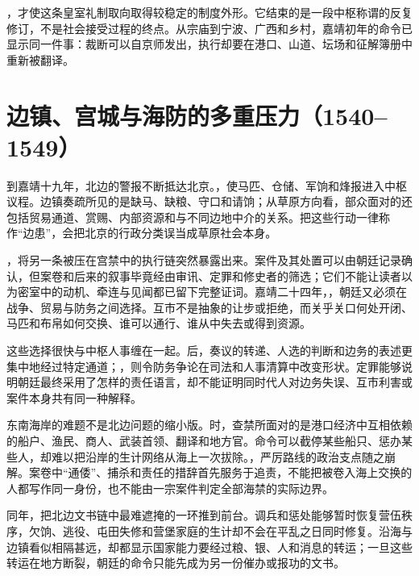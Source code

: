 ，才使这条皇室礼制取向取得较稳定的制度外形。它结束的是一段中枢称谓的反复修订，不是社会接受过程的终点。从宗庙到宁波、广西和乡村，嘉靖初年的命令已显示同一件事：裁断可以自京师发出，执行却要在港口、山道、坛场和征解簿册中重新被翻译。

\section{边镇、宫城与海防的多重压力（1540--1549）}

到嘉靖十九年，北边的警报不断抵达北京。，使马匹、仓储、军饷和烽报进入中枢议程。边镇奏疏所见的是缺马、缺粮、守口和请饷；从草原方向看，部众面对的还包括贸易通道、赏赐、内部资源和与不同边地中介的关系。把这些行动一律称作“边患”，会把北京的行政分类误当成草原社会本身。

，将另一条被压在宫禁中的执行链突然暴露出来。案件及其处置可以由朝廷记录确认，但案卷和后来的叙事毕竟经由审讯、定罪和修史者的筛选；它们不能让读者以为密室中的动机、牵连与见闻都已留下完整证词。嘉靖二十四年，，朝廷又必须在战争、贸易与防务之间选择。互市不是抽象的让步或拒绝，而关乎关口何处开闭、马匹和布帛如何交换、谁可以通行、谁从中失去或得到资源。

这些选择很快与中枢人事缠在一起。后，奏议的转递、人选的判断和边务的表述更集中地经过特定通道；，则令防务争论在司法和人事清算中改变形状。定罪能够说明朝廷最终采用了怎样的责任语言，却不能证明同时代人对边务失误、互市利害或案件本身共有同一种解释。

东南海岸的难题不是北边问题的缩小版。时，查禁所面对的是港口经济中互相依赖的船户、渔民、商人、武装首领、翻译和地方官。命令可以截停某些船只、惩办某些人，却难以把沿岸的生计网络从海上一次拔除。，严厉路线的政治支点随之崩解。案卷中“通倭”、捕杀和责任的措辞首先服务于追责，不能把被卷入海上交换的人都写作同一身份，也不能由一宗案件判定全部海禁的实际边界。

同年，把北边文书链中最难遮掩的一环推到前台。调兵和惩处能够暂时恢复营伍秩序，欠饷、逃役、屯田失修和营堡家庭的生计却不会在平乱之日同时修复。沿海与边镇看似相隔甚远，却都显示国家能力要经过粮、银、人和消息的转运；一旦这些转运在地方断裂，朝廷的命令只能先成为另一份催办或报功的文书。

